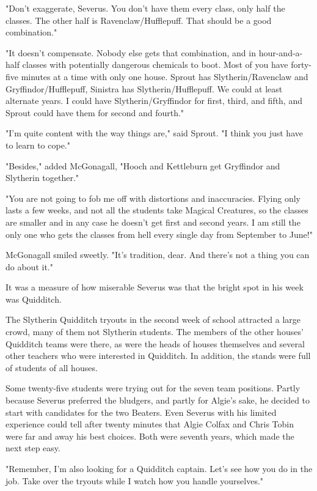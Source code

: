 "Don't exaggerate, Severus. You don't have them every class, only half the classes. The other half is Ravenclaw\slash Hufflepuff. That should be a good combination."

"It doesn't compensate. Nobody else gets that combination, and in hour-and-a-half classes with potentially dangerous chemicals to boot. Most of you have forty-five minutes at a time with only one house. Sprout has Slytherin\slash Ravenclaw and Gryffindor\slash Hufflepuff, Sinistra has Slytherin\slash Hufflepuff. We could at least alternate years. I could have Slytherin\slash Gryffindor for first, third, and fifth, and Sprout could have them for second and fourth."

"I'm quite content with the way things are," said Sprout. "I think you just have to learn to cope."

"Besides," added McGonagall, "Hooch and Kettleburn get Gryffindor and Slytherin together."

"You are not going to fob me off with distortions and inaccuracies. Flying only lasts a few weeks, and not all the students take Magical Creatures, so the classes are smaller and in any case he doesn't get first and second years. I am still the only one who gets the classes from hell every single day from September to June!"

McGonagall smiled sweetly. "It's tradition, dear. And there's not a thing you can do about it."

It was a measure of how miserable Severus was that the bright spot in his week was Quidditch.

The Slytherin Quidditch tryouts in the second week of school attracted a large crowd, many of them not Slytherin students. The members of the other houses' Quidditch teams were there, as were the heads of houses themselves and several other teachers who were interested in Quidditch. In addition, the stands were full of students of all houses.

Some twenty-five students were trying out for the seven team positions. Partly because Severus preferred the bludgers, and partly for Algie's sake, he decided to start with candidates for the two Beaters. Even Severus with his limited experience could tell after twenty minutes that Algie Colfax and Chris Tobin were far and away his best choices. Both were seventh years, which made the next step easy.

"Remember, I'm also looking for a Quidditch captain. Let's see how you do in the job. Take over the tryouts while I watch how you handle yourselves."

